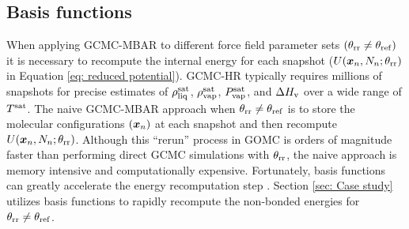 \documentclass[journal=jced,manuscript=article]{achemso}
\newcommand{\bfv}[1]{{\mbox{\boldmath{$#1$}}}}
\newcommand{\x}{\bfv{x}}
\begin{document}

\subsection{Basis functions} \label{sec: Basis functions}

When applying GCMC-MBAR to different force field parameter sets $(\theta_{\rm rr} \neq \theta_{\rm ref})$ it is necessary to recompute the internal energy for each snapshot ($U(\x_{n},N_n;\theta_{\rm rr})$ in Equation \ref{eq: reduced potential}). GCMC-HR typically requires millions of snapshots for precise estimates of $\rho_{\rm liq}^{\rm sat}$, $\rho_{\rm vap}^{\rm sat}$, $P_{\rm vap}^{\rm sat}$, and $\Delta H_{\rm v}$ over a wide range of $T^{\rm sat}$. The naive GCMC-MBAR approach when $\theta_{\rm rr} \neq \theta_{\rm ref}$ is to store the molecular configurations $(\x_{n})$ at each snapshot and then recompute $U(\x_{n},N_n;\theta_{\rm rr})$. Although this ``rerun'' process in GOMC is orders of magnitude faster than performing direct GCMC simulations with $\theta_{\rm rr}$, the naive approach is memory intensive and computationally expensive. Fortunately, basis functions can greatly accelerate the energy recomputation step \cite{naden:jctc:2016,Postdoc_1}. Section \ref{sec: Case study} utilizes basis functions to rapidly recompute the non-bonded energies for $\theta_{\rm rr} \neq \theta_{\rm ref}$.
\end{document}
